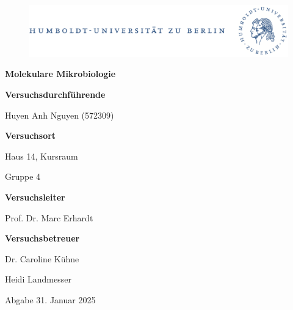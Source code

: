 \documentclass[oneside,10pt,a4paper]{report}
\begin{document}
	
	\begin{titlepage}
		\begin{center}
			\begin{figure}[h!tbp]
				\includegraphics[width=\linewidth]{HUlogo.PNG}
			\end{figure}
			\vspace*{2 cm}
			
			\textcolor{Bluetitle}{\textbf{\huge Molekulare Mikrobiologie}}\par
			
			\vspace*{2cm}
			\textcolor{Greyish}{\textbf{Versuchsdurchführende}}\par
			\textcolor{Greyish}{Huyen Anh Nguyen (572309)}\par
			
			\vspace*{0.5cm}
			\textcolor{Greyish}{\textbf{Versuchsort}}\par
			\textcolor{Greyish}{Haus 14, Kursraum}\par
			\textcolor{Greyish}{Gruppe 4}\par
			
			
			\vspace*{2 cm}
			\textcolor{Greyish}{\textbf{Versuchsleiter}}\par
			\textcolor{Greyish}{Prof. Dr. Marc Erhardt}\par
			\vspace*{0.5cm}
			\textcolor{Greyish}{\textbf{Versuchsbetreuer}}\par
			\textcolor{Greyish}{Dr. Caroline Kühne}\par
			\textcolor{Greyish}{Heidi Landmesser}\par

			
			\vspace*{2 cm}
			\textcolor{Greyish}{Abgabe 31. Januar 2025}\par
			
			
			
		\end{center}
	\end{titlepage}
	
	
	\tableofcontents
\end{document}
